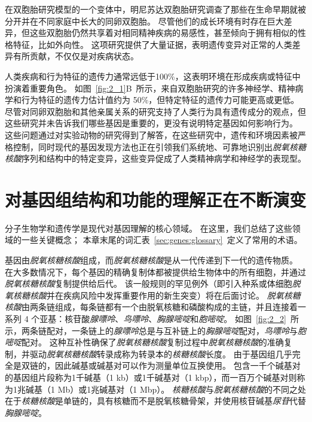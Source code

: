 在双胞胎研究模型的一个变体中，明尼苏达双胞胎研究调查了那些在生命早期就被分开并在不同家庭中长大的同卵双胞胎。
尽管他们的成长环境有时存在巨大差异，但这些双胞胎仍然共享着对相同精神疾病的易感性，甚至倾向于拥有相似的性格特征，比如外向性。
这项研究提供了大量证据，表明遗传变异对正常的人类差异有所贡献，不仅仅是对疾病状态。


人类疾病和行为特征的遗传力通常远低于100\%，这表明环境在形成疾病或特征中扮演着重要角色。
如图~\ref{fig:2_1}B~所示，来自双胞胎研究的许多神经学、精神病学和行为特征的遗传力估计值约为 50\%，但特定特征的遗传力可能更高或更低。
尽管对同卵双胞胎和其他亲属关系的研究支持了人类行为具有遗传成分的观点，但这些研究并未告诉我们哪些基因是重要的，更没有说明特定基因如何影响行为。
这些问题通过对实验动物的研究得到了解答，在这些研究中，遗传和环境因素被严格控制，同时现代的基因发现方法也正在引领我们系统地、可靠地识别出\textit{脱氧核糖核酸}序列和结构中的特定变异，这些变异促成了人类精神病学和神经学的表现型。


\section{对基因组结构和功能的理解正在不断演变}

分子生物学和遗传学是现代对基因理解的核心领域。
在这里，我们总结了这些领域的一些关键概念；
本章末尾的词汇表~\ref{sec:genes:glossary}~定义了常用的术语。


基因由\textit{脱氧核糖核酸}组成，而\textit{脱氧核糖核酸}是从一代传递到下一代的遗传物质。
在大多数情况下，每个基因的精确复制体都被提供给生物体中的所有细胞，并通过\textit{脱氧核糖核酸}复制提供给后代。
该一般规则的罕见例外（即引入种系或体细胞\textit{脱氧核糖核酸}并在疾病风险中发挥重要作用的新生突变）将在后面讨论。
\textit{脱氧核糖核酸}由两条链组成，每条链都有一个由脱氧核糖和磷酸构成的主链，并且连接着一系列 4 个亚基：核苷酸\textit{腺嘌呤}、\textit{鸟嘌呤}、\textit{胸腺嘧啶}和\textit{胞嘧啶}。
如图~\ref{fig:2_2}~所示，两条链配对，一条链上的\textit{腺嘌呤}总是与互补链上的\textit{胸腺嘧啶}配对，\textit{鸟嘌呤}与\textit{胞嘧啶}配对。
这种互补性确保了\textit{脱氧核糖核酸}复制过程中\textit{脱氧核糖核酸}的准确复制，并驱动\textit{脱氧核糖核酸}转录成称为转录本的\textit{核糖核酸}长度。
由于基因组几乎完全是双链的，因此碱基或碱基对可以作为测量单位互换使用。
包含一千个碱基对的基因组片段称为1千碱基（1 kb）或1千碱基对（1 kbp），而一百万个碱基对则称为1兆碱基（1 Mb）或1兆碱基对（1 Mbp）。
\textit{核糖核酸}与\textit{脱氧核糖核酸}的不同之处在于\textit{核糖核酸}是单链的，具有核糖而不是脱氧核糖骨架，并使用核苷碱基\textit{尿苷}代替\textit{胸腺嘧啶}。


